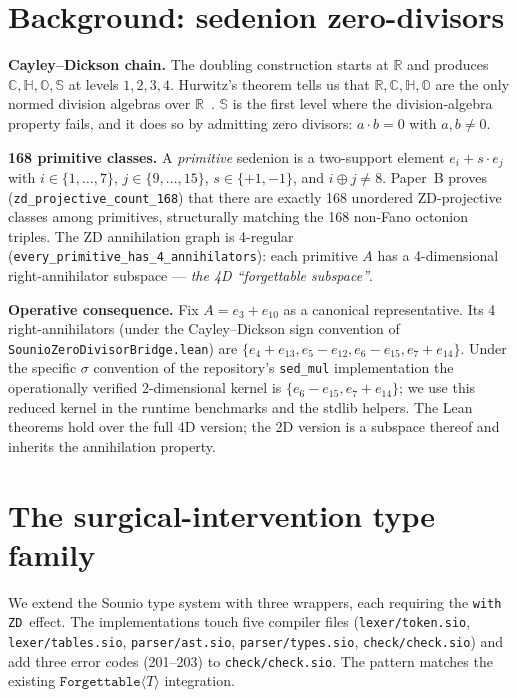 \documentclass{article}
\newcommand{\sio}{\mathbb{S}}
\newcommand{\Forgettable}[1]{\texttt{Forgettable}\langle #1 \rangle}
\newcommand{\withZD}{\texttt{with ZD}}
\begin{document}
\section{Background: sedenion zero-divisors}

\textbf{Cayley--Dickson chain.}  The doubling construction starts at
$\mathbb{R}$ and produces $\mathbb{C}, \mathbb{H}, \mathbb{O}, \sio$ at levels
$1, 2, 3, 4$.  Hurwitz's theorem tells us that $\mathbb{R}, \mathbb{C},
\mathbb{H}, \mathbb{O}$ are the only normed division algebras over
$\mathbb{R}$~\cite{hurwitz1898composition,baez2002octonions}.  $\sio$ is the
first level where the division-algebra property fails, and it does so by
admitting zero divisors: $a \cdot b = 0$ with $a, b \neq 0$.

\textbf{168 primitive classes.}  A \emph{primitive} sedenion is a two-support
element $e_i + s \cdot e_j$ with $i \in \{1,\ldots,7\}$, $j \in \{9,\ldots,15\}$,
$s \in \{+1,-1\}$, and $i \oplus j \neq 8$.  Paper~B proves
(\texttt{zd\_projective\_count\_168}) that there are exactly 168 unordered
ZD-projective classes among primitives, structurally matching the 168
non-Fano octonion triples.  The ZD annihilation graph is 4-regular
(\texttt{every\_primitive\_has\_4\_annihilators}): each primitive $A$ has a
4-dimensional right-annihilator subspace --- \emph{the 4D ``forgettable
subspace''}.

\textbf{Operative consequence.}  Fix $A = e_3 + e_{10}$ as a canonical
representative.  Its 4 right-annihilators (under the Cayley--Dickson sign
convention of \texttt{SounioZeroDivisorBridge.lean}) are $\{e_4 + e_{13},
e_5 - e_{12}, e_6 - e_{15}, e_7 + e_{14}\}$.  Under the specific $\sigma$
convention of the repository's \texttt{sed\_mul} implementation the
operationally verified 2-dimensional kernel is $\{e_6 - e_{15}, e_7 + e_{14}\}$;
we use this reduced kernel in the runtime benchmarks and the stdlib helpers.
The Lean theorems hold over the full 4D version; the 2D version is a subspace
thereof and inherits the annihilation property.

\section{The surgical-intervention type family}

We extend the Sounio type system with three wrappers, each requiring the
\withZD~effect.  The implementations touch five compiler files
(\texttt{lexer/token.sio}, \texttt{lexer/tables.sio}, \texttt{parser/ast.sio},
\texttt{parser/types.sio}, \texttt{check/check.sio}) and add three error
codes (201--203) to \texttt{check/check.sio}.  The pattern matches the
existing $\Forgettable{T}$ integration.
\end{document}
